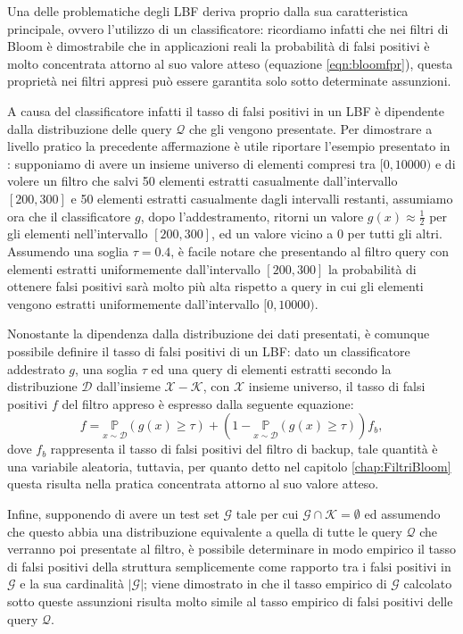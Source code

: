 \documentclass[../../main.tex]{subfiles}
\begin{document}
    
    Una delle problematiche degli LBF deriva proprio dalla sua caratteristica principale, ovvero l'utilizzo di un classificatore: ricordiamo infatti che nei filtri di Bloom è dimostrabile che in applicazioni reali la probabilità di falsi positivi è molto concentrata attorno al suo valore atteso (equazione \ref{eqn:bloomfpr}), questa proprietà nei filtri appresi può essere garantita solo sotto determinate assunzioni.

    A causa del classificatore infatti il tasso di falsi positivi in un LBF è dipendente dalla distribuzione delle query $\mathcal{Q}$ che gli vengono presentate. Per dimostrare a livello pratico la precedente affermazione è utile riportare l'esempio presentato in \cite{10.5555/3326943.3326986}: supponiamo di avere un insieme universo di elementi compresi tra $[0, 10000)$ e di volere un filtro che salvi 50 elementi estratti casualmente dall'intervallo $[200,300]$ e 50 elementi estratti casualmente dagli intervalli restanti, assumiamo ora che il classificatore $g$, dopo l'addestramento, ritorni un valore $g(x) \approx \frac{1}{2}$ per gli elementi nell'intervallo $[200,300]$, ed un valore vicino a 0 per tutti gli altri. Assumendo una soglia $\tau = 0.4$, è facile notare che presentando al filtro query con elementi estratti uniformemente dall'intervallo $[200,300]$ la probabilità di ottenere falsi positivi sarà molto più alta rispetto a query in cui gli elementi vengono estratti uniformemente dall'intervallo $[0, 10000)$.

    Nonostante la dipendenza dalla distribuzione dei dati presentati, è comunque possibile definire il tasso di falsi positivi di un LBF: dato un classificatore addestrato $g$, una soglia $\tau$ ed una query di elementi estratti secondo la distribuzione $\mathcal{D}$ dall'insieme $\mathcal{X} - \mathcal{K}$, con $\mathcal{X}$ insieme universo, il tasso di falsi positivi $f$ del filtro appreso è espresso dalla seguente equazione:
    \begin{equation}
        f = \underset{x \sim \mathcal{D}}{\mathbb{P}}(g(x) \geq \tau) + (1 - \underset{x \sim \mathcal{D}}{\mathbb{P}}(g(x) \geq \tau))f_b,
        \label{eqn:LBFFalsiPositivi}
    \end{equation} 
    dove $f_b$ rappresenta il tasso di falsi positivi del filtro di backup, tale quantità è una variabile aleatoria, tuttavia, per quanto detto nel capitolo \ref{chap:FiltriBloom} questa risulta nella pratica concentrata attorno al suo valore atteso.

    Infine, supponendo di avere un test set $\mathcal{G}$ tale per cui $\mathcal{G} \cap \mathcal{K} = \emptyset$ ed assumendo che questo abbia una distribuzione equivalente a quella di tutte le query $\mathcal{Q}$ che verranno poi presentate al filtro, è possibile determinare in modo empirico il tasso di falsi positivi della struttura semplicemente come rapporto tra i falsi positivi in $\mathcal{G}$ e la sua cardinalità $|\mathcal{G}|$; viene dimostrato in \cite{10.5555/3326943.3326986} che il tasso empirico di $\mathcal{G}$ calcolato sotto queste assunzioni risulta molto simile al tasso empirico di falsi positivi delle query $\mathcal{Q}$.
\end{document}
